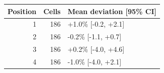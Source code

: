 \begin{tabular}{rrl}
\toprule
Position & Cells & Mean deviation [95\% CI] \\
\midrule
1 & 186 & +1.0\% [-0.2, +2.1] \\
2 & 186 & -0.2\% [-1.1, +0.7] \\
3 & 186 & +0.2\% [-4.0, +4.6] \\
4 & 186 & -1.0\% [-4.0, +2.1] \\
\bottomrule
\end{tabular}
